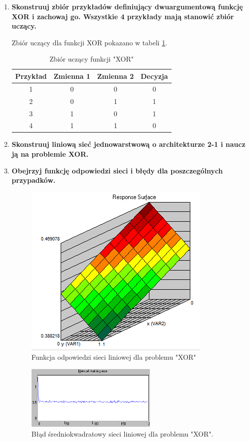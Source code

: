 \begin{enumerate}
\item \textbf{
Skonstruuj zbiór przykładów definiujący dwuargumentową funkcję XOR i zachowaj go. Wszystkie 4 przykłady mają stanowić zbiór uczący.}

Zbiór uczący dla funkcji XOR pokazano w tabeli \ref{tab:dataset_xor}. 

\begin{table}[ch]
	\centering
	\caption{Zbiór uczący funkcji "XOR"\label{tab:dataset_xor}}
	\begin{tabular}{|c|c|c|c|}
	\hline Przykład & Zmienna 1 & Zmienna 2 & Decyzja \\ 
	\hline 1 & 0 & 0 & 0 \\ 
	\hline 2 & 0 & 1 & 1 \\ 
	\hline 3 & 1 & 0 & 1 \\ 
	\hline 4 & 1 & 1 & 0 \\ 
	\hline 
	\end{tabular} 
\end{table}

\item \textbf{
Skonstruuj liniową sieć jednowarstwową o architekturze 2-1 i naucz ją na problemie XOR.}

\item \textbf{ Obejrzyj funkcję odpowiedzi sieci i błędy dla poszczególnych przypadków.}
\begin{figure}[h]
\centering
\includegraphics[scale=0.75]{dane/part1/zad2/response_xor}
\caption{Funkcja odpowiedzi sieci liniowej dla problemu "XOR"\label{fig:response_linear_xor}}
\end{figure}

\begin{figure}[h]
\centering
\includegraphics[width=0.6\textwidth]{dane/part1/zad2/error_xor}
\caption{Błąd średniokwadratowy sieci liniowej dla problemu "XOR".\label{fig:error_linear_xor}}
\end{figure}


\end{enumerate}
